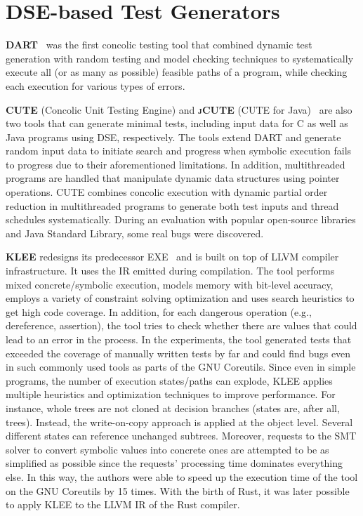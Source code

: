 \documentclass[paper=a4,%
  twoside,%
  BCOR4mm,%
  abstract=true,%
  toc=bibliography,%
  chapterprefix=true,%
  toc=bibliographynumbered,%
  open=right,%
  english,%
  pagesize=pdftex]{scrreprt}
\begin{document}
\section{DSE-based Test Generators}
\textbf{\textsc{DART}}~\cite{Godefroid_2005} was the first concolic testing tool that combined dynamic test generation with random testing and model checking techniques to systematically execute all (or as many as possible) feasible paths of a program, while checking each execution for various types of errors.


\textbf{\textsc{CUTE}} (Concolic Unit Testing Engine) and \textbf{\textsc{jCUTE}} (CUTE for Java)~\cite{Sen2006} are also two tools that can generate minimal tests, including input data for C as well as Java programs using \ac{DSE}, respectively. The tools extend \textsc{DART} and generate random input data to initiate search and progress when symbolic execution fails to progress due to their aforementioned limitations. In addition, multithreaded programs are handled that manipulate dynamic data structures using pointer operations. \textsc{CUTE} combines concolic execution with dynamic partial order reduction in multithreaded programs to generate both test inputs and thread schedules systematically. During an evaluation with popular open-source libraries and Java Standard Library, some real bugs were discovered.


\textbf{\textsc{KLEE}} redesigns its predecessor \textsc{EXE}~\cite{Cadar2008} and is built on top of LLVM compiler infrastructure. It uses the \ac{IR} emitted during compilation. The tool performs mixed concrete/symbolic execution, models memory with bit-level accuracy, employs a variety of constraint solving optimization and uses search heuristics to get high code coverage. In addition, for each dangerous operation (e.g., dereference, assertion), the tool tries to check whether there are values that could lead to an error in the process. In the experiments, the tool generated tests that exceeded the coverage of manually written tests by far and could find bugs even in such commonly used tools as parts of the GNU Coreutils. Since even in simple programs, the number of execution states/paths can explode, \textsc{KLEE} applies multiple heuristics and optimization techniques to improve performance. For instance, whole trees are not cloned at decision branches (states are, after all, trees). Instead, the write-on-copy approach is applied at the object level. Several different states can reference unchanged subtrees. Moreover, requests to the \ac{SMT} solver to convert symbolic values into concrete ones are attempted to be as simplified as possible since the requests' processing time dominates everything else. In this way, the authors were able to speed up the execution time of the tool on the GNU Coreutils by 15 times. With the birth of Rust, it was later possible to apply KLEE to the LLVM IR of the Rust compiler.
\end{document}
